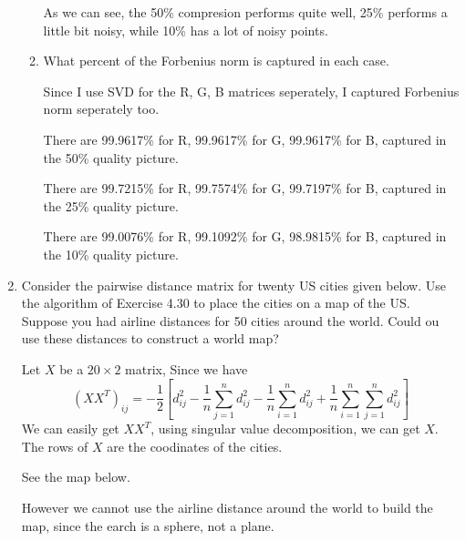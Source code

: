 \documentclass[a4paper, 12pt]{mcshw}
\begin{document}
\begin{enumerate}
\begin{enumerate}
                As we can see, the 50\% compresion performs quite well, 25\% performs a little bit noisy, while 10\% has a lot of noisy points.
                \vspace{4mm}
            \item What percent of the Forbenius norm is captured in each case.

                \vspace{2mm}
                Since I use SVD for the R, G, B matrices seperately, I captured Forbenius norm seperately too. 
                
                There are 99.9617\% for R, 99.9617\% for G, 99.9617\% for B, captured in the 50\% quality picture. 
                
                There are 99.7215\% for R, 99.7574\% for G, 99.7197\% for B, captured in the 25\% quality picture.
                
                There are 99.0076\% for R, 99.1092\% for G, 98.9815\% for B, captured in the 10\% quality picture.
        \end{enumerate}
    \item Consider the pairwise distance matrix for twenty US cities given below. Use the algorithm of Exercise 4.30 to place the cities on a map of the US. Suppose you had airline distances for 50 cities around the world. Could ou use these distances to construct a world map?
        \begin{solution}
            Let $X$ be a $20 \times 2$ matrix, Since we have
            $$(XX^T)_{ij} = -\frac{1}{2}[d_{ij}^2 - \frac{1}{n}\sum_{j = 1}^{n}d_{ij}^2 - \frac{1}{n}\sum_{i = 1}^nd_{ij}^2 + \frac{1}{n}\sum_{i = 1}^n\sum_{j = 1}^nd_{ij}^2]$$
            We can easily get $XX^T$, using singular value decomposition, we can get $X$. The rows of $X$ are the coodinates of the cities.
            
            See the map below.
            \pagebreak
                \begin{center}
                \end{center}
                However we cannot use the airline distance around the world to build the map, since the earch is a sphere, not a plane.
        \end{solution}
\end{enumerate}
\end{document}
